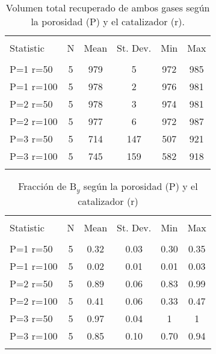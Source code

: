 \documentclass{article}
\begin{document}
\begin{table}[!htbp] \centering 
  \caption{Volumen total recuperado de ambos gases según la porosidad (P) y el catalizador (r).} 
  \label{r} 
  \label{} 
\begin{tabular}{@{\extracolsep{5pt}}lccccc} 
\\[-1.8ex]\hline 
\hline \\[-1.8ex] 
Statistic & \multicolumn{1}{c}{N} & \multicolumn{1}{c}{Mean} & \multicolumn{1}{c}{St. Dev.} & \multicolumn{1}{c}{Min} & \multicolumn{1}{c}{Max} \\ 
\hline \\[-1.8ex] 
P=1 r=50 & 5 & 979 & 5 & 972 & 985 \\ 
P=1 r=100 & 5 & 978 & 2 & 976 & 981 \\ 
P=2 r=50 & 5 & 978 & 3 & 974 & 981 \\ 
P=2 r=100 & 5 & 977 & 6 & 972 & 987 \\ 
P=3 r=50 & 5 & 714 & 147 & 507 & 921 \\ 
P=3 r=100 & 5 & 745 & 159 & 582 & 918 \\ 
\hline \\[-1.8ex] 
\end{tabular} 
\end{table} 

\begin{table}[!htbp] \centering 
  \caption{Fracción de B$_y$ según la porosidad (P) y el catalizador (r) } 
  \label{f} 
\begin{tabular}{@{\extracolsep{5pt}}lccccc} 
\\[-1.8ex]\hline 
\hline \\[-1.8ex] 
Statistic & \multicolumn{1}{c}{N} & \multicolumn{1}{c}{Mean} & \multicolumn{1}{c}{St. Dev.} & \multicolumn{1}{c}{Min} & \multicolumn{1}{c}{Max} \\ 
\hline \\[-1.8ex] 
P=1 r=50 & 5 & 0.32 & 0.03 & 0.30 & 0.35 \\ 
P=1 r=100 & 5 & 0.02 & 0.01 & 0.01 & 0.03 \\ 
P=2 r=50 & 5 & 0.89 & 0.06 & 0.83 & 0.99 \\ 
P=2 r=100 & 5 & 0.41 & 0.06 & 0.33 & 0.47 \\ 
P=3 r=50 & 5 & 0.97 & 0.04 & 1 & 1 \\ 
P=3 r=100 & 5 & 0.85 & 0.10 & 0.70 & 0.94 \\ 
\hline \\[-1.8ex] 
\end{tabular} 
\end{table} 
\end{document}
